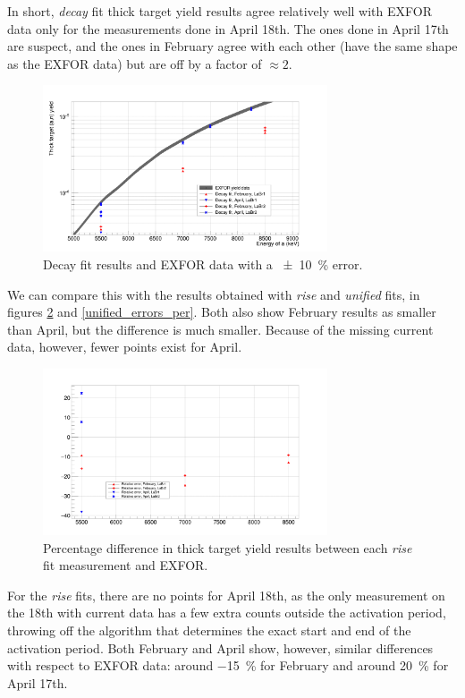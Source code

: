 \documentclass[a4paper,12pt]{report}
\begin{document}
In short, \textit{decay} fit thick target yield results agree relatively well with EXFOR data only for the measurements done in April 18th.
The ones done in April 17th are suspect, and the ones in February agree with each other (have the same shape as the EXFOR data) but are off by a factor of $\approx 2$.

\begin{figure}[H]
	\centering
	\includegraphics[width=0.75\textwidth]{reactions_v_energy_decay.png}
	\caption{Decay fit results and EXFOR data with a \qty{\pm 10}{\percent} error.}
	\label{reactions_v_energy_decay}
\end{figure}

We can compare this with the results obtained with \textit{rise} and \textit{unified} fits, in figures \ref{rise_errors_per} and \ref{unified_errors_per}.
Both also show February results as smaller than April, but the difference is much smaller.
Because of the missing current data, however, fewer points exist for April.

\begin{figure}[H]
	\centering
	\includegraphics[width=0.75\textwidth]{rise_errors_per.png}
	\caption{Percentage difference in thick target yield results between each \textit{rise} fit measurement and EXFOR.}
	\label{rise_errors_per}
\end{figure}

For the \textit{rise} fits, there are no points for April 18th, as the only measurement on the 18th with current data has a few extra counts outside the activation period, throwing off the algorithm that determines the exact start and end of the activation period.
Both February and April show, however, similar differences with respect to EXFOR data: around \qty{-15}{\percent} for February and around \qty{+20}{\percent} for April 17th.
\end{document}
